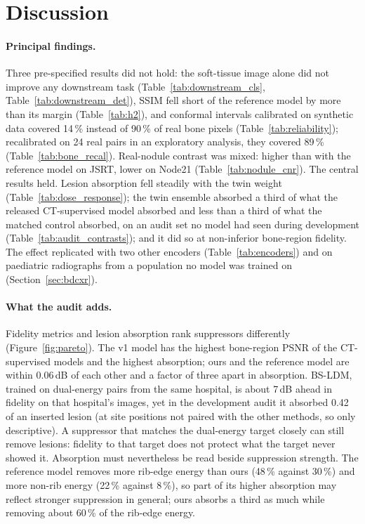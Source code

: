 \section{Discussion}
\label{sec:discussion}
\paragraph{Principal findings.} Three pre-specified results did not hold: the soft-tissue image alone did not improve any downstream task
(Table~\ref{tab:downstream_cls}, Table~\ref{tab:downstream_det}), SSIM fell short of the reference model by more than its margin
(Table~\ref{tab:h2}), and conformal intervals calibrated on synthetic data covered 14\,\% instead of 90\,\% of real bone pixels
(Table~\ref{tab:reliability}); recalibrated on 24 real pairs in an exploratory analysis, they covered 89\,\% (Table~\ref{tab:bone_recal}). Real-nodule contrast was mixed: higher than with the reference model on JSRT, lower on Node21
(Table~\ref{tab:nodule_cnr}). The central results held. Lesion absorption fell steadily with the twin weight (Table~\ref{tab:dose_response}); the
twin ensemble absorbed a third of what the released CT-supervised model absorbed and less than a third of what the matched control absorbed, on
an audit set no model had seen during development (Table~\ref{tab:audit_contrasts}); and it did so at non-inferior bone-region fidelity. The effect
replicated with two other encoders (Table~\ref{tab:encoders}) and on paediatric radiographs from a population no model was trained on (Section~\ref{sec:bdcxr}).

\paragraph{What the audit adds.} Fidelity metrics and lesion absorption rank suppressors differently (Figure~\ref{fig:pareto}). The v1 model has
the highest bone-region PSNR of the CT-supervised models and the highest absorption; ours and the reference model are within 0.06\,dB of each
other and a factor of three apart in absorption. BS-LDM, trained on dual-energy pairs from the same hospital, is about 7\,dB ahead in fidelity on
that hospital's images, yet in the development audit it absorbed 0.42 of an inserted lesion (at site positions not paired with the other
methods, so only descriptive). A suppressor that matches the dual-energy target closely can still remove lesions: fidelity to that target does
not protect what the target never showed it. Absorption must nevertheless be read beside suppression strength. The reference model removes more
rib-edge energy than ours (48\,\% against 30\,\%) and more non-rib energy (22\,\% against 8\,\%), so part of its higher absorption may reflect
stronger suppression in general; ours absorbs a third as much while removing about 60\,\% of the rib-edge energy.

